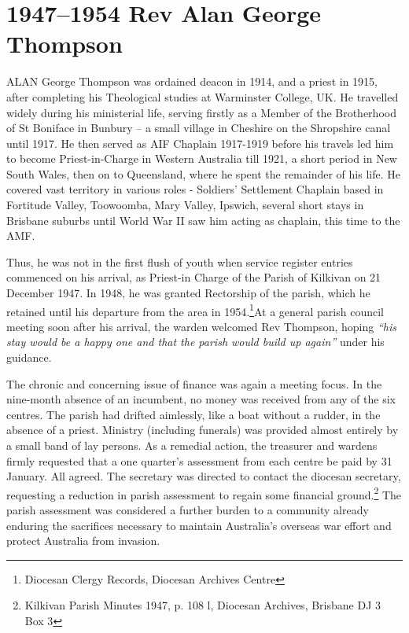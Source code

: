 \balance


\printendnotes[custom]
\setcounter{endnote}{0}




\chapter{1947--1954 Rev Alan George Thompson}
\nobalance


\lettrine[lines=3]{A}{LAN}
 George Thompson was ordained deacon in 1914, and a priest in 1915, after completing his Theological studies at Warminster College, UK. He travelled widely during his ministerial life, serving firstly as a Member of the Brotherhood of St Boniface in Bunbury -- a small village in Cheshire on the Shropshire canal until 1917. He then served as AIF Chaplain 1917-1919 before his travels led him to become Priest-in-Charge in Western Australia till 1921, a short period in New South Wales, then on to Queensland, where he spent the remainder of his life. He covered vast territory in various roles - Soldiers' Settlement Chaplain based in Fortitude Valley, Toowoomba, Mary Valley, Ipswich, several short stays in Brisbane suburbs until World War II saw him acting as chaplain, this time to the AMF.

Thus, he was not in the first flush of youth when service register entries commenced on his arrival, as Priest-in Charge of the Parish of Kilkivan on 21 December 1947. In 1948, he was granted Rectorship of the parish, which he retained until his departure from the area in 1954.\footnote{Diocesan Clergy Records, Diocesan Archives Centre}At a general parish council meeting soon after his arrival, the warden welcomed Rev Thompson, hoping \emph{``his stay would be a happy one and that the parish would build up again''} under his guidance.


The chronic and concerning issue of finance was again a meeting focus. In the nine-month absence of an incumbent, no money was received from any of the six centres. The parish had drifted aimlessly, like a boat without a rudder, in the absence of a priest. Ministry (including funerals) was provided almost entirely by a small band of lay persons. As a remedial action, the treasurer and wardens firmly requested that a one quarter's assessment from each centre be paid by 31 January. All agreed. The secretary was directed to contact the diocesan secretary, requesting a reduction in parish assessment to regain some financial ground.\footnote{Kilkivan Parish Minutes 1947, p. 108 l, Diocesan Archives, Brisbane DJ 3 Box 3} The parish assessment was considered a further burden to a community already enduring the sacrifices necessary to maintain Australia's overseas war effort and protect Australia from invasion.


